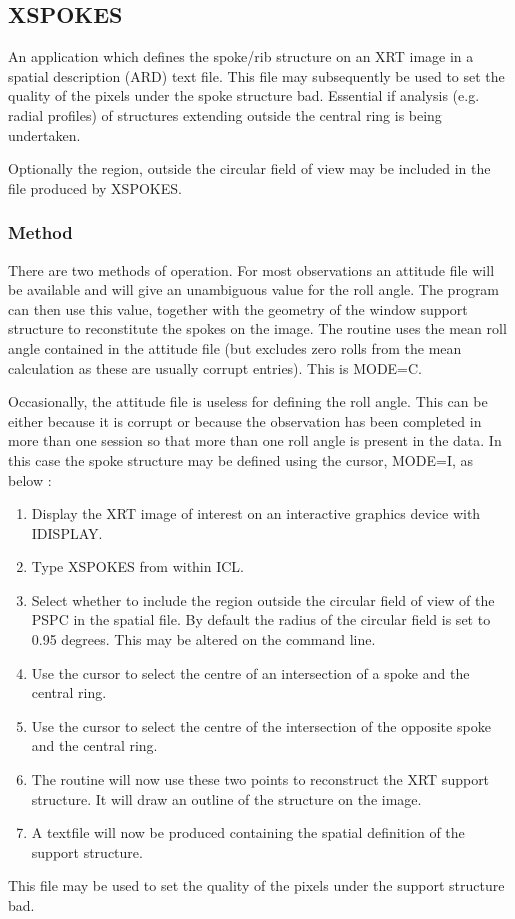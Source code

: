 \documentclass{book}
\renewcommand{\_}{{\tt\char'137}}     %
\begin{document}
\subsection{XSPOKES}
An application which defines the spoke/rib structure on an XRT
image in a spatial description (ARD) text file.
This file may subsequently be used to set the quality of the pixels under the
spoke structure bad. Essential if analysis (e.g. radial profiles)
of structures extending outside the central ring is being undertaken.
 
Optionally the region, outside the circular field of view may be
included in the file produced by XSPOKES.
 
\subsubsection{Method}
There are two methods of operation. For most observations an attitude
file will be available and will give an unambiguous value for the
roll angle. The program can then use this value, together with
the geometry of the window support structure to reconstitute the spokes
on the image. The routine uses the mean roll angle contained in the
attitude file (but excludes zero rolls from the mean calculation as
these are usually corrupt entries). This is MODE=C.
 
Occasionally, the attitude file is useless for defining
the roll angle. This can be either because it is corrupt or because
the observation has been completed in more than one session so that
more than one roll angle is present in the data. In this case the
spoke structure may be defined using the cursor, MODE=I, as below :
 
\begin{enumerate}
\item Display the XRT image of interest on an interactive graphics device
with IDISPLAY.
\item Type XSPOKES from within ICL.
\item Select whether to include the region outside the circular field
of view of the PSPC in the spatial file. By default
the radius of the circular field is set to 0.95 degrees. This
may be altered on the command line.
\item Use the cursor to select the centre of an intersection of
a spoke and the central ring.
\item Use the cursor to select the centre of the intersection of
the opposite spoke and the central ring.
\item The routine will now use these two points to reconstruct the
XRT support structure. It will draw an outline of the
structure on the image.
\item A textfile will now be produced containing the spatial
definition of the support structure.
\end{enumerate}
This file may be used to set the quality of the pixels
under the support structure bad.
 
\end{document}
